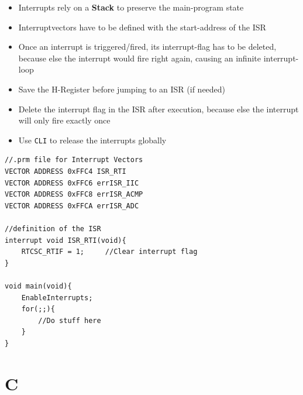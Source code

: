 \documentclass[a4paper, 11pt, nofootinbib]{book}
\newcommand{\code}[1]{\texttt{#1}}
\begin{document}
\begin{itemize}
	\item Interrupts rely on a \textbf{Stack} to preserve the main-program state
	\item Interruptvectors have to be defined with the start-address of the ISR
	\item Once an interrupt is triggered/fired, its interrupt-flag has to be deleted, because else the interrupt would fire right again, causing an infinite interrupt-loop
	\item Save the H-Register before jumping to an ISR (if needed)
	\item Delete the interrupt flag in the ISR after execution, because else the interrupt will only fire exactly once
	\item Use \code{CLI} to release the interrupts globally
\end{itemize}
\begin{lstlisting}[caption={Programming of an interrupt}]
//.prm file for Interrupt Vectors
VECTOR ADDRESS 0xFFC4 ISR_RTI
VECTOR ADDRESS 0xFFC6 errISR_IIC
VECTOR ADDRESS 0xFFC8 errISR_ACMP
VECTOR ADDRESS 0xFFCA errISR_ADC

//definition of the ISR
interrupt void ISR_RTI(void){
	RTCSC_RTIF = 1;		//Clear interrupt flag
}

void main(void){
	EnableInterrupts;
	for(;;){
		//Do stuff here
	}
}

\end{lstlisting}

\chapter{C}
\end{document}
